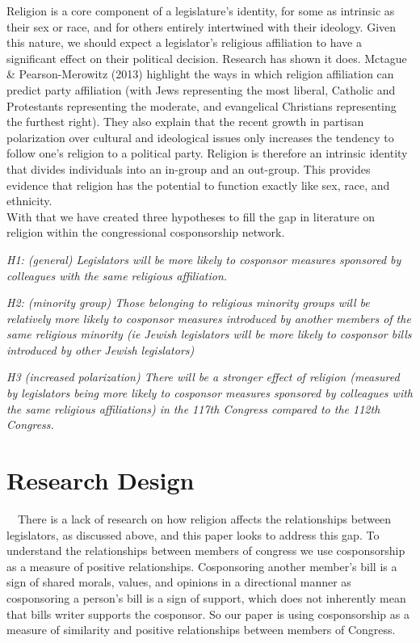 \documentclass[Royal,times,sageh]{sagej}
\begin{document}
Religion is a core component of a legislature's identity, for some as
intrinsic as their sex or race, and for others entirely intertwined with
their ideology. Given this nature, we should expect a legislator's
religious affiliation to have a significant effect on their political
decision. Research has shown it does. Mctague \& Pearson-Merowitz (2013)
highlight the ways in which religion affiliation can predict party
affiliation (with Jews representing the most liberal, Catholic and
Protestants representing the moderate, and evangelical Christians
representing the furthest right). They also explain that the recent
growth in partisan polarization over cultural and ideological issues
only increases the tendency to follow one's religion to a political
party. Religion is therefore an intrinsic identity that divides
individuals into an in-group and an out-group. This provides evidence
that religion has the potential to function exactly like sex, race, and
ethnicity.\\
With that we have created three hypotheses to fill the gap in literature
on religion within the congressional cosponsorship network.

\emph{H1: (general) Legislators will be more likely to cosponsor
measures sponsored by colleagues with the same religious affiliation.}

\emph{H2: (minority group) Those belonging to religious minority groups
will be relatively more likely to cosponsor measures introduced by
another members of the same religious minority (ie Jewish legislators
will be more likely to cosponsor bills introduced by other Jewish
legislators)}

\emph{H3 (increased polarization) There will be a stronger effect of
religion (measured by legislators being more likely to cosponsor
measures sponsored by colleagues with the same religious affiliations)
in the 117th Congress compared to the 112th Congress. }

\hypertarget{research-design}{%
\section{Research Design}\label{research-design}}

\doublespacing

~~There is a lack of research on how religion affects the relationships
between legislators, as discussed above, and this paper looks to address
this gap. To understand the relationships between members of congress we
use cosponsorship as a measure of positive relationships. Cosponsoring
another member's bill is a sign of shared morals, values, and opinions
in a directional manner as cosponsoring a person's bill is a sign of
support, which does not inherently mean that bills writer supports the
cosponsor. So our paper is using cosponsorship as a measure of
similarity and positive relationships between members of Congress.
\end{document}
